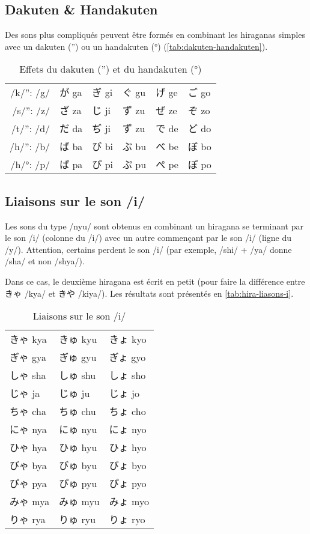 \documentclass[a4paper,10pt,french,openany]{memoir}
\begin{document}
\subsection{Dakuten \& Handakuten}

Des sons plus compliqués peuvent être formés en combinant les hiraganas simples avec un dakuten ('') ou un handakuten (°) (\autoref{tab:dakuten-handakuten}).

\begin{table}[htbp]
 \centering
 \caption{Effets du dakuten ('') et du handakuten (°)}
 \label{tab:dakuten-handakuten}
 \begin{tabular}{r|lllll}
  /k/'': /g/ & が ga & ぎ gi & ぐ gu & げ ge & ご go \\
  /s/'': /z/ & ざ za & じ ji & ず zu & ぜ ze & ぞ zo \\
  /t/'': /d/ & だ da & ぢ ji & ず zu & で de & ど do \\
  /h/'': /b/ & ば ba & び bi & ぶ bu & べ be & ぼ bo \\
  /h/°: /p/  & ぱ pa & ぴ pi & ぷ pu & ぺ pe & ぽ po \\
 \end{tabular}
\end{table}

\subsection{Liaisons sur le son /i/}

Les sons du type /nyu/ sont obtenus en combinant un hiragana se terminant par le son /i/ (colonne du /i/) avec un autre commençant par le son /i/ (ligne du /y/). Attention, certains perdent le son /i/ (par exemple, /shi/ + /ya/ donne /sha/ et non /shya/).

Dans ce cas, le deuxième hiragana est écrit en petit (pour faire la différence entre きゃ /kya/ et きや /kiya/). Les résultats sont présentés en \autoref{tab:hira-liasons-i}.

\begin{table}[htbp]
 \centering
 \caption{Liaisons sur le son /i/}
 \label{tab:hira-liasons-i}
 \begin{tabular}{lll}
  きゃ kya& きゅ kyu& きょ kyo\\
  ぎゃ gya& ぎゅ gyu& ぎょ gyo\\
  しゃ sha& しゅ shu& しょ sho\\
  じゃ ja & じゅ ju & じょ jo \\
  ちゃ cha& ちゅ chu& ちょ cho\\
  にゃ nya& にゅ nyu& にょ nyo\\
  ひゃ hya& ひゅ hyu& ひょ hyo\\
  びゃ bya& びゅ byu& びょ byo\\
  ぴゃ pya& ぴゅ pyu& ぴょ pyo\\
  みゃ mya& みゅ myu& みょ myo\\
  りゃ rya& りゅ ryu& りょ ryo\\
 \end{tabular}
\end{table}
\end{document}

